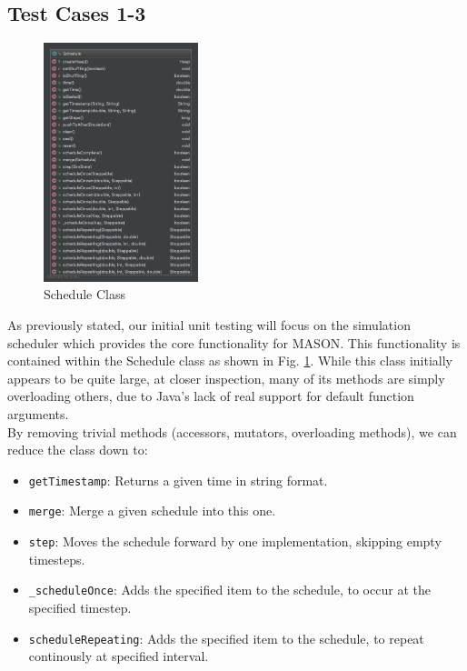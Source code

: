 \documentclass[11pt]{article}
\begin{document}
\subsection{Test Cases 1-3}
\begin{figure} 
	\vspace{-25pt}
	\begin{center}
		\includegraphics[width=0.4\textwidth]{Appendix/Schedule}
		\caption{Schedule Class}
		\label{fig:schedule}
	\end{center}
\end{figure}
As previously stated, our initial unit testing will focus on the simulation scheduler which provides the core functionality for MASON. This functionality is contained within the Schedule class as shown in Fig. \ref{fig:schedule}. While this class initially appears to be quite large, at closer inspection, many of its methods are simply overloading others, due to Java's lack of real support for default function arguments.
\\

By removing trivial methods (accessors, mutators, overloading methods), we can reduce the class down to:
\begin{itemize}
	\item \texttt{getTimestamp}: Returns a given time in string format.
	\item \texttt{merge}: Merge a given schedule into this one.
	\item \texttt{step}: Moves the schedule forward by one implementation, skipping empty timesteps.
	\item \texttt{\_scheduleOnce}: Adds the specified item to the schedule, to occur at the specified timestep.
	\item \texttt{scheduleRepeating}: Adds the specified item to the schedule, to repeat continously at specified interval.
\end{itemize}
\end{document}
